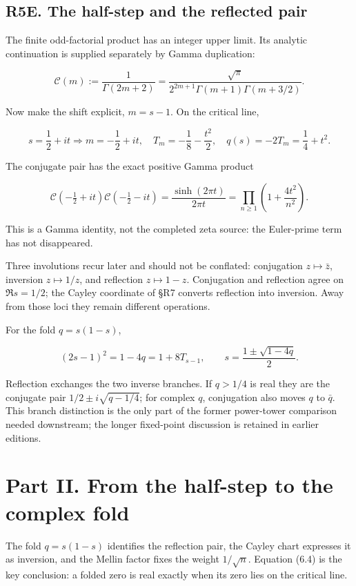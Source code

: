 \documentclass[
  11pt,
]{book}
\begin{document}
\section{R5E. The half-step and the reflected
pair}\label{r5e.-the-half-step-and-the-reflected-pair}

The finite odd-factorial product has an integer upper limit. Its
analytic continuation is supplied separately by Gamma duplication:

\[
\mathcal C(m):=\frac1{\Gamma(2m+2)}
=\frac{\sqrt\pi}{2^{2m+1}\Gamma(m+1)\Gamma(m+3/2)}.
\tag{HS.1}
\]

Now make the shift explicit, \(m=s-1\). On the critical line,

\[
s=\frac12+it
\Longrightarrow
m=-\frac12+it,
\quad T_m=-\frac18-\frac{t^2}{2},
\quad q(s)=-2T_m=\frac14+t^2.
\tag{HS.2}
\]

The conjugate pair has the exact positive Gamma product

\[
\boxed{\mathcal C(-\tfrac12+it)\mathcal C(-\tfrac12-it)
=\frac{\sinh(2\pi t)}{2\pi t}
=\prod_{n\ge1}\left(1+\frac{4t^2}{n^2}\right).}
\tag{HS.3}
\]

This is a Gamma identity, not the completed zeta source: the Euler-prime
term has not disappeared.

Three involutions recur later and should not be conflated: conjugation
\(z\mapsto\bar z\), inversion \(z\mapsto1/z\), and reflection
\(z\mapsto1-z\). Conjugation and reflection agree on \(\Re s=1/2\); the
Cayley coordinate of §R7 converts reflection into inversion. Away from
those loci they remain different operations.

For the fold \(q=s(1-s)\),

\[
(2s-1)^2=1-4q=1+8T_{s-1},
\qquad
s=\frac{1\pm\sqrt{1-4q}}2.
\tag{HS.8}
\]

Reflection exchanges the two inverse branches. If \(q>1/4\) is real they
are the conjugate pair \(1/2\pm i\sqrt{q-1/4}\); for complex \(q\),
conjugation also moves \(q\) to \(\bar q\). This branch distinction is
the only part of the former power-tower comparison needed downstream;
the longer fixed-point discussion is retained in earlier editions.

\chapter{Part II. From the half-step to the complex
fold}\label{part-ii.-from-the-half-step-to-the-complex-fold}

The fold \(q=s(1-s)\) identifies the reflection pair, the Cayley chart
expresses it as inversion, and the Mellin factor fixes the weight
\(1/\sqrt n\). Equation (6.4) is the key conclusion: a folded zero is
real exactly when its zero lies on the critical line.
\end{document}
